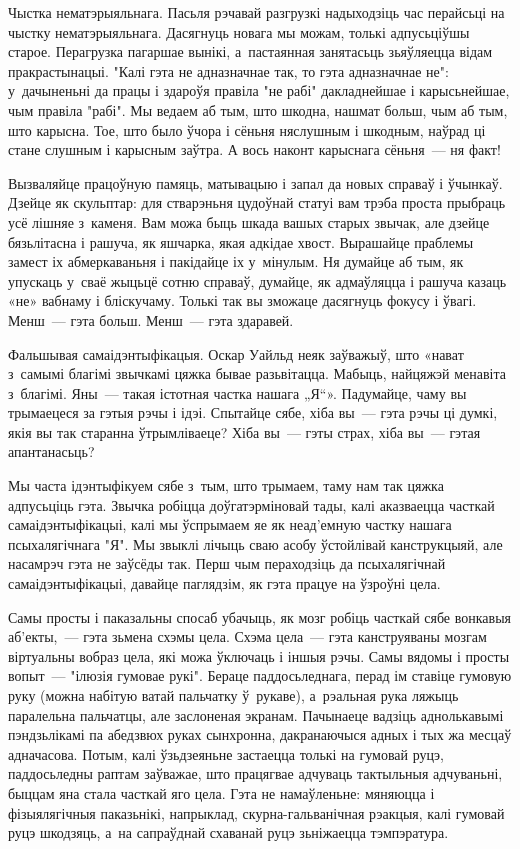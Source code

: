 Чыстка нематэрыяльнага. Пасьля рэчавай разгрузкі надыходзіць час перайсьці на чыстку нематэрыяльнага. Дасягнуць новага мы можам, толькі адпусьціўшы старое. Перагрузка пагаршае вынікі, а~пастаянная занятасьць зьяўляецца відам пракрастынацыі. "Калі гэта не адназначнае так, то гэта адназначнае не": у~дачыненьні да працы і здароўя правіла "не рабі" дакладнейшае і карысьнейшае, чым правіла "рабі". Мы ведаем аб тым, што шкодна, нашмат больш, чым аб тым, што карысна. Тое, што было ўчора і сёньня няслушным і шкодным, наўрад ці стане слушным і карысным заўтра. А вось наконт карыснага сёньня~--- ня факт!

Вызваляйце працоўную памяць, матывацыю і запал да новых справаў і ўчынкаў. Дзейце як скульптар: для стварэньня цудоўнай статуі вам трэба проста прыбраць усё лішняе з~каменя. Вам можа быць шкада вашых старых звычак, але дзейце бязьлітасна і рашуча, як яшчарка, якая адкідае хвост. Вырашайце праблемы замест іх абмеркаваньня і пакідайце іх у~мінулым. Ня думайце аб тым, як упускаць у~сваё жыцьцё сотню справаў, думайце, як адмаўляцца і рашуча казаць «не» вабнаму і бліскучаму. Толькі так вы зможаце дасягнуць фокусу і ўвагі. Менш~--- гэта больш. Менш~--- гэта здаравей.

Фальшывая самаідэнтыфікацыя. Оскар Уайльд неяк заўважыў, што «нават з~самымі благімі звычкамі цяжка бывае разьвітацца. Мабыць, найцяжэй менавіта з~благімі. Яны~--- такая істотная частка нашага „Я“». Падумайце, чаму вы трымаецеся за гэтыя рэчы і ідэі. Спытайце сябе, хіба вы~--- гэта рэчы ці думкі, якія вы так старанна ўтрымліваеце? Хіба вы~--- гэты страх, хіба вы~--- гэтая апантанасьць?

Мы часта ідэнтыфікуем сябе з~тым, што трымаем, таму нам так цяжка адпусьціць гэта. Звычка робіцца доўгатэрміновай тады, калі аказваецца часткай самаідэнтыфікацыі, калі мы ўспрымаем яе як неад'емную частку нашага псыхалягічнага "Я". Мы звыклі лічыць сваю асобу ўстойлівай канструкцыяй, але насамрэч гэта не заўсёды так. Перш чым пераходзіць да псыхалягічнай самаідэнтыфікацыі, давайце паглядзім, як гэта працуе на ўзроўні цела.

Самы просты і паказальны спосаб убачыць, як мозг робіць часткай сябе вонкавыя аб'екты,~--- гэта зьмена схэмы цела. Схэма цела~--- гэта канструяваны мозгам віртуальны вобраз цела, які можа ўключаць і іншыя рэчы. Самы вядомы і просты вопыт~--- "ілюзія гумовае рукі". Бераце паддосьледнага, перад ім ставіце гумовую руку (можна набітую ватай пальчатку ў~рукаве), а~рэальная рука ляжыць паралельна пальчатцы, але заслоненая экранам. Пачынаеце вадзіць аднолькавымі пэндзьлікамі па абедзвюх руках сынхронна, дакранаючыся адных і тых жа месцаў адначасова. Потым, калі ўзьдзеяньне застаецца толькі на гумовай руцэ, паддосьледны раптам заўважае, што працягвае адчуваць тактыльныя адчуваньні, быццам яна стала часткай яго цела. Гэта не намаўленьне: мяняюцца і фізыялягічныя паказьнікі, напрыклад, скурна-гальванічная рэакцыя, калі гумовай руцэ шкодзяць, а~на сапраўднай схаванай руцэ зьніжаецца тэмпэратура.

